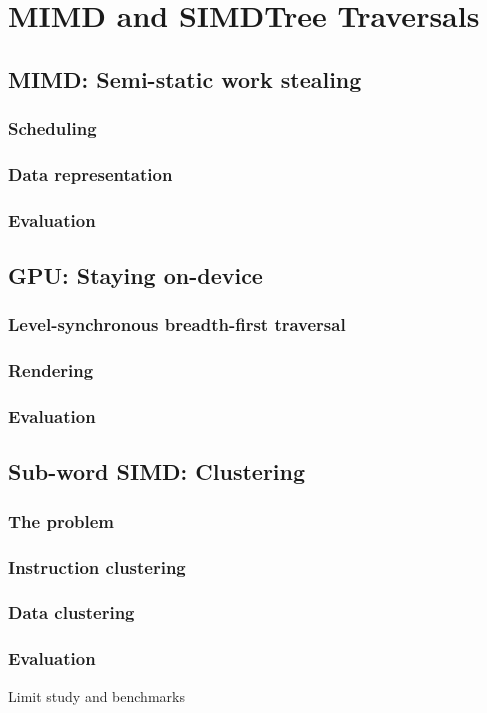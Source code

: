 \chapter{MIMD and SIMDTree Traversals}
\section{MIMD: Semi-static work stealing}
\subsection{Scheduling}
\subsection{Data representation}
\subsection{Evaluation}
\section{GPU: Staying on-device}
\subsection{Level-synchronous breadth-first traversal}
\subsection{Rendering}
\subsection{Evaluation}
\section{Sub-word SIMD: Clustering}
\subsection{The problem}
\subsection{Instruction clustering}
\subsection{Data clustering}
\subsection{Evaluation}
Limit study and benchmarks
